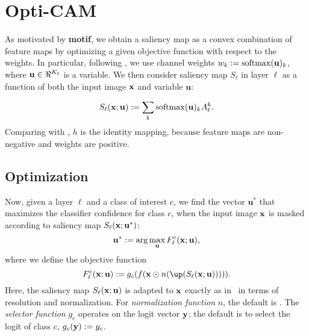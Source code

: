 \section{Opti-CAM}
As motivated by \textbf{motif}, we obtain a saliency map as a convex combination of feature maps
 by optimizing a given objective function with respect to the weights.
In particular, following \citep{wang2020score}, we use channel weights $w_k \mathrel{:=} \operatorname{softmax}(
	\mathbf{u})_k$, where $\mathbf{u} \in \real^{K_\ell}$ is a variable.
We then consider saliency map $S_\ell$ in layer $\ell$ as a function of both the input image $\mathbf{x}$ 
and variable $\mathbf{u}$:

\begin{equation}
    S_\ell(\mathbf{x}; \mathbf{u}) \mathrel{:=} \sum_k \operatorname{softmax}(\mathbf{u})_k A^k_\ell.
\label{eq:v-sal}
\end{equation}
Comparing with , $h$ is the identity mapping, because feature maps are non-negative and
 weights are positive.


\subsection{Optimization}
Now, given a layer $\ell$ and a class of interest $c$, we find the vector $\mathbf{u}^*$ that
 maximizes the classifier confidence for class $c$, when the input image $\mathbf{x}$ is masked according 
 to saliency map $S_\ell(\mathbf{x}; \mathbf{u}^*)$:
\begin{equation}
	\mathbf{u}^* \mathrel{:=} \arg\max_{\mathbf{u}} F^c_\ell(\mathbf{x}; \mathbf{u}),
\label{eq:opt}
\end{equation}
where we define the objective function
\begin{equation}
	F^c_\ell(\vx; \mathbf{u}) \defn g_c(f(\vx \odot n(\up(S_\ell(\vx; \mathbf{u}))))).
\label{eq:obj}
\end{equation}
Here, the saliency map $S_\ell(\mathbf{x}; \mathbf{u})$ is adapted to $\mathbf{x}$ exactly as in~ in 
terms of resolution and normalization. For \emph{normalization function} $n$, the default is
 . 
The \emph{selector function} $g_c$ operates on the logit vector $\mathbf{y}$; the default is to select the
 logit of class $c$, \ie $g_c(\mathbf{y}) \mathrel{:=} y_c$. %


